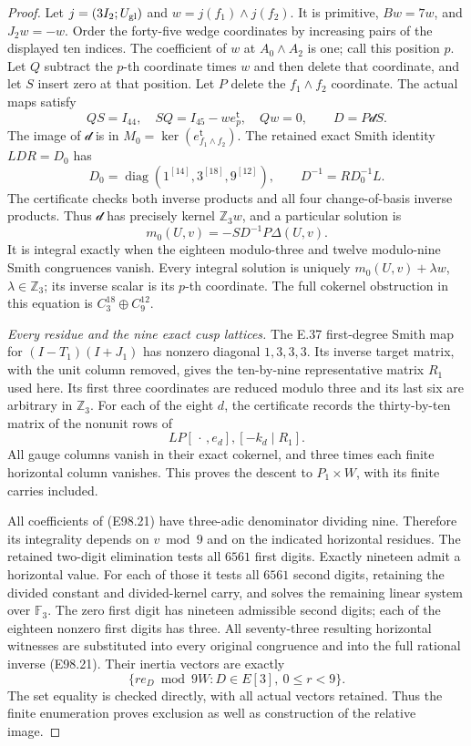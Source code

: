 \begin{proof}
Let $j=(3I_2;U_{\rm gl})$ and $w=j(f_1)\wedge j(f_2)$.
It is primitive, $Bw=7w$, and $J_2w=-w$.
Order the forty-five wedge coordinates by increasing
pairs of the displayed ten indices. The coefficient
of $w$ at $A_0\wedge A_2$ is one; call this position $p$.
Let $Q$ subtract the $p$-th coordinate times $w$ and
then delete that coordinate, and let $S$ insert zero
at that position. Let $P$ delete the $f_1\wedge f_2$
coordinate. The actual maps satisfy
\[
 QS=I_{44},\quad SQ=I_{45}-w e_p^{\mathsf t},\quad
 Qw=0,\qquad D=P\mathcal dS.
 \tag{E98.19}
\]
The image of $\mathcal d$ is in
$M_0=\ker(e_{f_1\wedge f_2}^{\mathsf t})$.
The retained exact Smith identity $LDR=D_0$ has
\[
 D_0=\operatorname{diag}(1^{[14]},3^{[18]},9^{[12]}),
 \qquad D^{-1}=R D_0^{-1}L.
 \tag{E98.20}
\]
The certificate checks both inverse products and all
four change-of-basis inverse products. Thus $\mathcal d$
has precisely kernel $\mathbb Z_3w$, and a particular
solution is
\[
                       m_0(U,v)=-SD^{-1}P\Delta(U,v).
 \tag{E98.21}
\]
It is integral exactly when the eighteen modulo-three
and twelve modulo-nine Smith congruences vanish. Every
integral solution is uniquely $m_0(U,v)+\lambda w$,
$\lambda\in\mathbb Z_3$; its inverse scalar is its
$p$-th coordinate. The full cokernel obstruction in
this equation is $C_3^{18}\oplus C_9^{12}$.

\emph{Every residue and the nine exact cusp lattices.}
The E.37 first-degree Smith map for
$(I-T_1)(I+J_1)$ has nonzero diagonal $1,3,3,3$.
Its inverse target matrix, with the unit column
removed, gives the ten-by-nine representative matrix
$R_1$ used here. Its first three coordinates are reduced
modulo three and its last six are arbitrary in $\mathbb Z_3$.
For each of the eight $d$, the certificate records the
thirty-by-ten matrix of the nonunit rows of
\[
       LP[\,\cdot\,,e_d],[-k_d\mid R_1].
 \tag{E98.22}
\]
All gauge columns vanish in their exact cokernel, and
three times each finite horizontal column vanishes.
This proves the descent to $P_1\times W$, with its
finite carries included.

All coefficients of (E98.21) have three-adic
denominator dividing nine. Therefore its integrality
depends on $v\bmod9$ and on the indicated horizontal
residues. The retained two-digit elimination tests
all $6561$ first digits. Exactly nineteen admit a
horizontal value. For each of those it tests all
$6561$ second digits, retaining the divided constant
and divided-kernel carry, and solves the remaining
linear system over $\mathbb F_3$. The zero first digit
has nineteen admissible second digits; each of the
eighteen nonzero first digits has three. All seventy-three
resulting horizontal witnesses are substituted into
every original congruence and into the full rational
inverse (E98.21). Their inertia vectors are exactly
\[
          \{r e_D\bmod9W:D\in E[3],\ 0\le r<9\}.
 \tag{E98.23}
\]
The set equality is checked directly, with all actual
vectors retained. Thus the finite enumeration proves
exclusion as well as construction of the relative image.


\end{proof}
